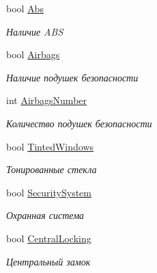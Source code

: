 \begin{DoxyCompactItemize}
bool \hyperlink{class_r_t_1_1_parsing_libs_1_1_models_1_1_automoto_additional_info_a77e5915b1062e22d7f3cccdf5bda72b7}{Abs}
\begin{DoxyCompactList}\small\item\em Наличие A\+B\+S \end{DoxyCompactList}\item 
bool \hyperlink{class_r_t_1_1_parsing_libs_1_1_models_1_1_automoto_additional_info_a5201c00c4e7d4bc6a97443a5b64132bb}{Airbags}
\begin{DoxyCompactList}\small\item\em Наличие подушек безопасности \end{DoxyCompactList}\item 
int \hyperlink{class_r_t_1_1_parsing_libs_1_1_models_1_1_automoto_additional_info_a75703495df4089fa549110a6bea2c395}{Airbags\+Number}
\begin{DoxyCompactList}\small\item\em Количество подушек безопасности \end{DoxyCompactList}\item 
bool \hyperlink{class_r_t_1_1_parsing_libs_1_1_models_1_1_automoto_additional_info_a62984098d9f315c9daaf836a6a78520d}{Tinted\+Windows}
\begin{DoxyCompactList}\small\item\em Тонированные стекла \end{DoxyCompactList}\item 
bool \hyperlink{class_r_t_1_1_parsing_libs_1_1_models_1_1_automoto_additional_info_ac572ffef4d9b9765aa1c28c5344ce0cb}{Security\+System}
\begin{DoxyCompactList}\small\item\em Охранная система \end{DoxyCompactList}\item 
bool \hyperlink{class_r_t_1_1_parsing_libs_1_1_models_1_1_automoto_additional_info_a3c1e7e51a0465b256bc3470de4e7b0b9}{Central\+Locking}
\begin{DoxyCompactList}\small\item\em Центральный замок \end{DoxyCompactList}\item 

\end{DoxyCompactItemize}
